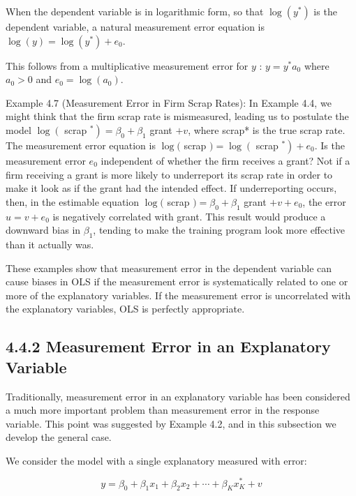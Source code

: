\documentclass[10pt]{article}
\begin{document}
When the dependent variable is in logarithmic form, so that $\log \left(y^{*}\right)$ is the dependent variable, a natural measurement error equation is\\
$\log (y)=\log \left(y^{*}\right)+e_{0}$.

This follows from a multiplicative measurement error for $y$ : $y=y^{*} a_{0}$ where $a_{0}>0$ and $e_{0}=\log \left(a_{0}\right)$.

Example 4.7 (Measurement Error in Firm Scrap Rates): In Example 4.4, we might think that the firm scrap rate is mismeasured, leading us to postulate the model $\log \left(\right.$ scrap $\left.^{*}\right)=\beta_{0}+\beta_{1}$ grant $+v$, where scrap* is the true scrap rate. The measurement error equation is $\log ($ scrap $)=\log \left(\right.$ scrap $\left.^{*}\right)+e_{0}$. Is the measurement error $e_{0}$ independent of whether the firm receives a grant? Not if a firm receiving a grant is more likely to underreport its scrap rate in order to make it look as if the grant had the intended effect. If underreporting occurs, then, in the estimable equation $\log ($ scrap $)= \beta_{0}+\beta_{1}$ grant $+v+e_{0}$, the error $u=v+e_{0}$ is negatively correlated with grant. This result would produce a downward bias in $\beta_{1}$, tending to make the training program look more effective than it actually was.

These examples show that measurement error in the dependent variable can cause biases in OLS if the measurement error is systematically related to one or more of the explanatory variables. If the measurement error is uncorrelated with the explanatory variables, OLS is perfectly appropriate.

\subsection*{4.4.2 Measurement Error in an Explanatory Variable}
Traditionally, measurement error in an explanatory variable has been considered a much more important problem than measurement error in the response variable. This point was suggested by Example 4.2, and in this subsection we develop the general case.

We consider the model with a single explanatory measured with error:


\begin{equation*}
y=\beta_{0}+\beta_{1} x_{1}+\beta_{2} x_{2}+\cdots+\beta_{K} x_{K}^{*}+v \tag{4.41}
\end{equation*}
\end{document}

